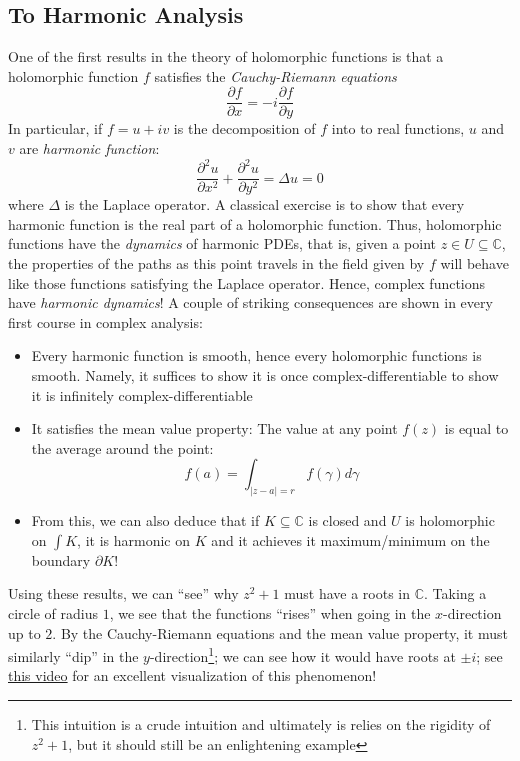\documentclass{article}
\newcommand{\C}{\mathbb{C}}
\newcommand{\sse}{\subseteq}
\begin{document}
\subsection{To Harmonic Analysis}

One of the first results in the theory of holomorphic functions is that a holomorphic function $f$ satisfies
the \emph{Cauchy-Riemann equations}
\[
  \frac{\partial f}{\partial x} = - i\frac{\partial f}{\partial y}
\]
In particular, if $f = u+iv$ is the decomposition of $f$ into to real functions, $u$ and $v$ are \emph{harmonic
function}:
\[
  \frac{\partial^2 u}{\partial x^2} + \frac{\partial^2 u}{\partial y^2} = \Delta u = 0
\]
where $\Delta$ is the Laplace operator. A classical exercise is to show that every harmonic function is the
real part of a holomorphic function. Thus, holomorphic functions have the \emph{dynamics} of harmonic PDEs,
that is, given a point $z \in U \sse \C$, the properties of the paths as this point travels in the field given
by $f$ will behave like those functions satisfying the Laplace operator. Hence, complex functions have
\emph{harmonic dynamics}! A couple of striking consequences are shown in every first course in
complex analysis:

\begin{itemize}
  \item Every harmonic function is smooth, hence every holomorphic functions is smooth. Namely, it suffices to
    show it is once complex-differentiable to show it is infinitely complex-differentiable
  \item It satisfies the mean value property: The value at any point $f(z)$ is equal to the average around
    the point:
    \[
      f(a) = \int_{|z-a|=r} f(\gamma)d\gamma
    \]
  \item From this, we can also deduce that if $K \sse \C$ is closed and $U$ is holomorphic on $\int K$, it is
    harmonic on $K$ and it achieves it maximum/minimum on the boundary $\partial K$!
\end{itemize}

Using these results, we can ``see'' why $z^2+1$ must have a roots in $\C$. Taking a circle of radius
$1$, we see that the functions ``rises'' when going in the $x$-direction up to $2$. By the Cauchy-Riemann
equations and the mean value property, it must similarly ``dip'' in the $y$-direction\footnote{This intuition
  is a crude intuition and ultimately is relies on the rigidity of $z^2+1$, but it should still be an
enlightening example}; we can see how it would have roots at $\pm i$; see
\href{https://www.youtube.com/watch?v=T647CGsuOVU}{this video} for an excellent visualization of this
phenomenon!
\end{document}
